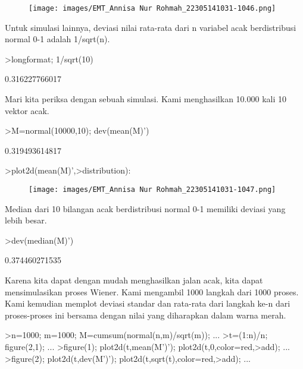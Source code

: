 \documentclass[a4paper,10pt]{article}
\begin{document}
\begin{eulernotebook}
\begin{eulercomment}
\begin{eulercomment}
\begin{eulercomment}
\begin{eulercomment}
\begin{figure}[h]
    \centering
    \texttt{[image: images/EMT\_Annisa Nur Rohmah\_22305141031-1046.png]}
\end{figure}
\begin{eulercomment}
Untuk simulasi lainnya, deviasi nilai rata-rata dari n variabel acak
berdistribusi normal 0-1 adalah 1/sqrt(n).
\end{eulercomment}
\begin{eulerprompt}
>longformat; 1/sqrt(10)
\end{eulerprompt}
\begin{euleroutput}
  0.316227766017
\end{euleroutput}
\begin{eulercomment}
Mari kita periksa dengan sebuah simulasi. Kami menghasilkan 10.000
kali 10 vektor acak.
\end{eulercomment}
\begin{eulerprompt}
>M=normal(10000,10); dev(mean(M)')
\end{eulerprompt}
\begin{euleroutput}
  0.319493614817
\end{euleroutput}
\begin{eulerprompt}
>plot2d(mean(M)',>distribution):
\end{eulerprompt}
\begin{figure}[h]
    \centering
    \texttt{[image: images/EMT\_Annisa Nur Rohmah\_22305141031-1047.png]}
\end{figure}
\begin{eulercomment}
Median dari 10 bilangan acak berdistribusi normal 0-1 memiliki deviasi
yang lebih besar.
\end{eulercomment}
\begin{eulerprompt}
>dev(median(M)')
\end{eulerprompt}
\begin{euleroutput}
  0.374460271535
\end{euleroutput}
\begin{eulercomment}
Karena kita dapat dengan mudah menghasilkan jalan acak, kita dapat
mensimulasikan proses Wiener. Kami mengambil 1000 langkah dari 1000
proses. Kami kemudian memplot deviasi standar dan rata-rata dari
langkah ke-n dari proses-proses ini bersama dengan nilai yang
diharapkan dalam warna merah.
\end{eulercomment}
\begin{eulerprompt}
>n=1000; m=1000; M=cumsum(normal(n,m)/sqrt(m)); ...
>t=(1:n)/n; figure(2,1); ...
>figure(1); plot2d(t,mean(M')'); plot2d(t,0,color=red,>add); ...
>figure(2); plot2d(t,dev(M')'); plot2d(t,sqrt(t),color=red,>add); ...

\end{eulerprompt}
\end{eulercomment}
\end{eulercomment}
\end{eulercomment}
\end{eulercomment}
\end{eulernotebook}
\end{document}
